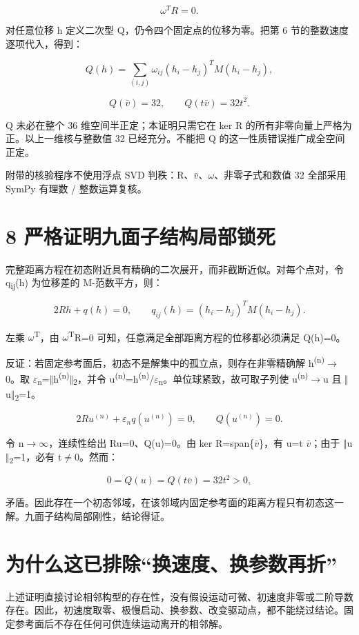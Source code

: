 \documentclass[UTF8,a4paper,11pt]{ctexart}
\begin{document}
\[
\omega^T R=0.
\]

对任意位移 h 定义二次型 Q，仍令四个固定点的位移为零。把第 6 节的整数速度逐项代入，得到：


\[
Q(h)=\sum_{(i,j)}\omega_{ij}(h_i-h_j)^TM(h_i-h_j),
\]


\[
Q(\bar v)=32,\qquad Q(t\bar v)=32t^2.
\]

Q 未必在整个 36 维空间半正定；本证明只需它在 ker R 的所有非零向量上严格为正。以上一维核与整数值 32 已经充分。不能把 Q 的这一性质错误推广成全空间正定。

附带的核验程序不使用浮点 SVD 判秩：R、\(\bar v\)、\(\omega\)、非零子式和数值 32 全部采用 SymPy 有理数 / 整数运算复核。

\newpage
\section*{8  严格证明九面子结构局部锁死}
完整距离方程在初态附近具有精确的二次展开，而非截断近似。对每个点对，令 q\textsubscript{ij}(h) 为位移差的 M-范数平方，则：


\[
2Rh+q(h)=0,\qquad q_{ij}(h)=(h_i-h_j)^TM(h_i-h_j).
\]

左乘 \(\omega\)\textsuperscript{T}，由 \(\omega\)\textsuperscript{T}R=0 可知，任意满足全部距离方程的位移都必须满足 Q(h)=0。

反证：若固定参考面后，初态不是解集中的孤立点，则存在非零精确解 h\textsuperscript{(n)}\(\to\)0。取 \(\varepsilon\)\textsubscript{n}=\(\Vert\)h\textsuperscript{(n)}\(\Vert\)\textsubscript{2}，并令 u\textsuperscript{(n)}=h\textsuperscript{(n)}/\(\varepsilon\)\textsubscript{n}。单位球紧致，故可取子列使 u\textsuperscript{(n)}\(\to\)u 且 \(\Vert\)u\(\Vert\)\textsubscript{2}=1。


\[
2Ru^{(n)}+\varepsilon_n q(u^{(n)})=0,\qquad Q(u^{(n)})=0.
\]

令 n\(\to\)\(\infty\)，连续性给出 Ru=0、Q(u)=0。由 ker R=span\{\(\bar v\)\}，有 u=t \(\bar v\)；由于 \(\Vert\)u\(\Vert\)\textsubscript{2}=1，必有 t\(\ne\)0。然而：


\[
0=Q(u)=Q(t\bar v)=32t^2>0,
\]

矛盾。因此存在一个初态邻域，在该邻域内固定参考面的距离方程只有初态这一解。九面子结构局部刚性，结论得证。

\section*{为什么这已排除“换速度、换参数再折”}
上述证明直接讨论相邻构型的存在性，没有假设运动可微、初速度非零或二阶导数存在。因此，初速度取零、极慢启动、换参数、改变驱动点，都不能绕过结论。固定参考面后不存在任何可供连续运动离开的相邻解。
\end{document}
